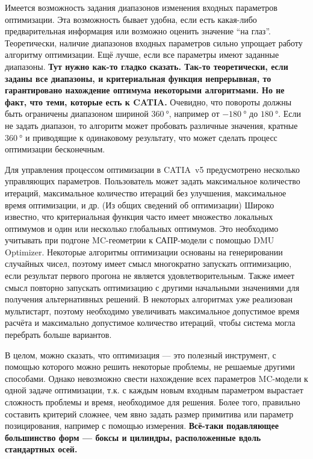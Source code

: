 Имеется возможность задания диапазонов изменения входных параметров оптимизации. Эта возможность бывает удобна, если есть какая-либо предварительная информация или возможно оценить значение ``на глаз''.
\todo Теоретически, наличие диапазонов входных параметров сильно упрощает работу алгоритму оптимизации. Ещё лучше, если все параметры имеют заданные диапазоны. \todo \textbf{Тут нужно как-то гладко сказать. Так-то теоретически, если заданы все диапазоны, и критериальная функция непрерывная, то гарантировано нахождение оптимума некоторыми алгоритмами. Но не факт, что теми, которые есть к CATIA.}
Очевидно, что повороты должны быть ограничены диапазоном шириной $\SI{360}{\degree}$, например от $\SI{-180}{\degree}$ до $\SI{180}{\degree}$. Если не задать диапазон, то алгоритм может пробовать различные значения, кратные $\SI{360}{\degree}$ и приводящие к одинаковому результату, что может сделать процесс оптимизации бесконечным.

Для управления процессом оптимизации в CATIA~v5 предусмотрено несколько управляющих параметров. Пользователь может задать максимальное количество итераций, максимальное количество итераций без улучшения, максимальное время оптимизации, и др. \todo
(Из общих сведений об оптимизации)
Широко известно, что критериальная функция часто имеет множество локальных оптимумов и один или несколько глобальных оптимумов. Это необходимо учитывать при подгоне MC-геометрии к САПР-модели с помощью DMU Optimizer. Некоторые алгоритмы оптимизации основаны на генерировании случайных чисел, поэтому имеет смысл многократно запускать оптимизацию, если результат первого прогона не является удовлетворительным. Также имеет смысл повторно запускать оптимизацию с другими начальными значениями для получения альтернативных решений. В некоторых алгоритмах уже реализован мультистарт, поэтому необходимо увеличивать максимальное допустимое время расчёта и максимально допустимое количество итераций, чтобы система могла перебрать больше вариантов.

В целом, можно сказать, что оптимизация --- это полезный инструмент, с помощью которого можно решить некоторые проблемы, не решаемые другими способами. Однако невозможно свести нахождение всех параметров MC-модели к одной задаче оптимизации, т.к. с каждым новым входным параметром вырастает сложность проблемы и время, необходимое для решения. Более того, правильно составить критерий сложнее, чем явно задать размер примитива или параметр позицирования, например с помощью измерения. \textbf{Всё-таки подавляющее большинство форм --- боксы и цилиндры, расположенные вдоль стандартных осей.}
